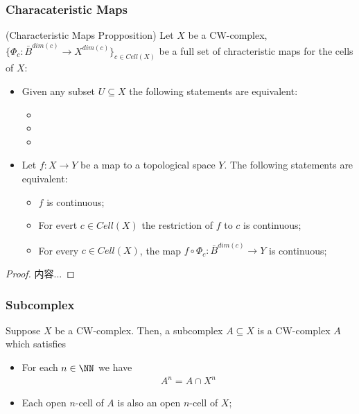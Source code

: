 \documentclass[Total.tex]{subfiles}
\begin{document}
	\subsubsection{Characateristic Maps}
	\begin{proposition}
		(Characteristic Maps Propposition) Let $X$ be a CW-complex, $\{\Phi_c:\bar{B}^{dim(c)}\rightarrow X^{dim(c)}\}_{c\in Cell(X)}$ be a full set of chracteristic maps for the cells of $X$:
		\begin{itemize}
			\item Given any subset $U\subseteq X$ the following statements are equivalent:
			\begin{itemize}
				\item 
				\item 
				\item 
			\end{itemize}
			\item Let $f:X\rightarrow Y$ be a map to a topological space $Y$. The following statements are equivalent:
			\begin{itemize}
				\item $f$ is continuous;
				\item For evert $c\in Cell(X)$ the restriction of $f$ to $c$ is continuous;
				\item For every $c\in Cell(X)$, the map $f\circ \Phi_c:\bar{B}^{dim(c)}\rightarrow Y$ is continuous; 
			\end{itemize}
		\end{itemize}
	\end{proposition}
	\begin{proof}
		内容...
	\end{proof}
	\subsubsection{Subcomplex}
	\begin{Def}
		Suppose $X$ be a CW-complex. Then, a subcomplex $A\subseteq X$ is a CW-complex $A$ which satisfies
		\begin{itemize}
			\item For each $n\in \NN$ we have
			\begin{gather*}
				A^n=A\cap X^n
			\end{gather*}
			\item Each open $n$-cell of $A$ is also an open $n$-cell of $X$;
		\end{itemize}
	\end{Def}
	
\end{document}
